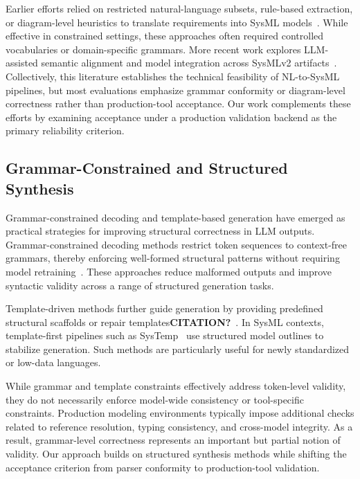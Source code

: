 \documentclass[colorlinks,upint,subscriptcorrection,varvw,hyphenate,balance]{asmeconf} %
\begin{document}
Earlier efforts relied on restricted natural-language subsets, rule-based extraction, or diagram-level heuristics to translate requirements into SysML models~\cite{li2021restrictednlsysmlmodels,kbs2022nlpsystemsengineeringsysml,mistry2024texttomodeltransformationsysml}. While effective in constrained settings, these approaches often required controlled vocabularies or domain-specific grammars. More recent work explores LLM-assisted semantic alignment and model integration across SysMLv2 artifacts~\cite{anonymous2025semanticalignmentsysmlv2,hendricks2025texttomodel_sysml}. Collectively, this literature establishes the technical feasibility of NL-to-SysML pipelines, but most evaluations emphasize grammar conformity or diagram-level correctness rather than production-tool acceptance. Our work complements these efforts by examining acceptance under a production validation backend as the primary reliability criterion.

\subsection{Grammar-Constrained and Structured Synthesis}

Grammar-constrained decoding and template-based generation have emerged as practical strategies for improving structural correctness in LLM outputs. Grammar-constrained decoding methods restrict token sequences to context-free grammars, thereby enforcing well-formed structural patterns without requiring model retraining~\cite{geng2023gcd,park2024grammaraligneddecoding,frontiers2024gcdie}. These approaches reduce malformed outputs and improve syntactic validity across a range of structured generation tasks.

Template-driven methods further guide generation by providing predefined structural scaffolds or repair templates\textbf{CITATION?}~\cite{huang2025_template_guided_program_repair}. In SysML contexts, template-first pipelines such as SysTemp~\cite{bouamra2025systemp} use structured model outlines to stabilize generation. Such methods are particularly useful for newly standardized or low-data languages.

While grammar and template constraints effectively address token-level validity, they do not necessarily enforce model-wide consistency or tool-specific constraints. Production modeling environments typically impose additional checks related to reference resolution, typing consistency, and cross-model integrity. As a result, grammar-level correctness represents an important but partial notion of validity. Our approach builds on structured synthesis methods while shifting the acceptance criterion from parser conformity to production-tool validation.
\end{document}
